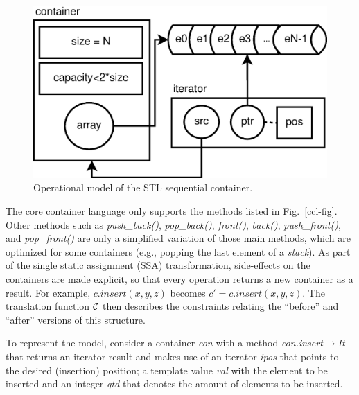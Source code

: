 \documentclass[conference]{IEEEtran}
\begin{document}
\begin{figure}[ht] \centering
\includegraphics[scale=0.3]{figures/stl-iterator}
\caption{Operational model of the STL sequential container.}
\label{figure:stl-iterator}
\end{figure}



The core container language only supports the methods listed in Fig.~\ref{ccl-fig}.
Other methods such as \emph{push\_back()}, \emph{pop\_back()}, \emph{front()},
\emph{back()}, \emph{push\_front()}, and \emph{pop\_front()} are only
a simplified variation of those main methods, which are optimized for some containers
(e.g., popping the last element of a \textit{stack}).
As part of the single static assignment (SSA) transformation, side-effects on the containers
are made explicit, so that every operation returns a new container as a result. For example,
$\mathit{c.insert\left(x,y,z\right)}$ becomes $\mathit{c' = c.insert\left(x,y,z\right)}$.
The translation function $\cal C$ then describes the constraints relating the ``before''
and ``after'' versions of this structure.

To represent the model, consider a container \textit{con} with a
method \textit{con.insert}$\rightarrow$\textit{It} that returns an iterator result and
makes use of an iterator \textit{ipos} that points to the desired
(insertion) position; a template value \textit{val} with the element
to be inserted and an integer \textit{qtd} that denotes the amount
of elements to be inserted.
\end{document}
